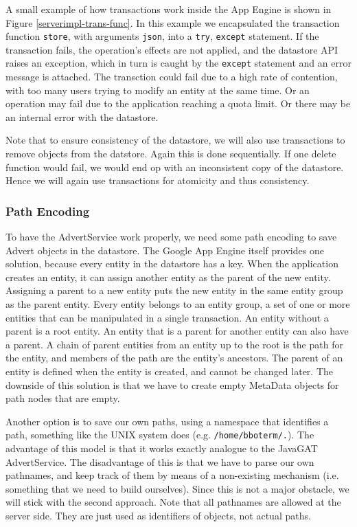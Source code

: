 A small example of how transactions work inside the App Engine is shown in Figure
\ref{serverimpl-trans-func}. In this example we encapsulated the transaction
function \texttt{store}, with arguments \texttt{json}, into a \texttt{try},
\texttt{except} statement. If the transaction fails, the operation's effects are not
applied, and the datastore API raises an exception, which in turn is caught by
the \texttt{except} statement and an error message is attached. The transction
could fail due to a high rate of contention, with too many users trying
to modify an entity at the same time. Or an operation may fail due to the
application reaching a quota limit. Or there may be an internal error with the
datastore.

Note that to ensure consistency of the datastore, we will also use transactions
to remove objects from the datstore. Again this is done sequentially. If one
delete function would fail, we would end op with an inconsistent copy of the
datastore. Hence we will again use transactions for atomicity and thus
consistency.

\subsubsection{Path Encoding}
To have the AdvertService work properly, we need some path encoding to save
Advert objects in the datastore. The Google App Engine itself provides one
solution, because every entity in the datastore has a key. When the application
creates an entity, it can assign another entity as the parent of the new entity.
Assigning a parent to a new entity puts the new entity in the same entity group
as the parent entity. Every entity belongs to an entity group, a set of one or
more entities that can be manipulated in a single transaction. An entity without
a parent is a root entity. An entity that is a parent for another entity can also
have a parent. A chain of parent entities from an entity up to the root is the
path for the entity, and members of the path are the entity's ancestors. The
parent of an entity is defined when the entity is created, and cannot be changed
later. The downside of this solution is that we have to create empty MetaData
objects for path nodes that are empty.

Another option is to save our own paths, using a namespace that identifies a
path, something like the UNIX system does (e.g. \texttt{/home/bboterm/.}). The
advantage of this model is that it works exactly analogue to the JavaGAT
AdvertService. The disadvantage of this is that we have to parse our own
pathnames, and keep track of them by means of a non-existing mechanism (i.e.
something that we need to build ourselves). Since this is not a major obstacle,
we will stick with the second approach. Note that all pathnames are allowed at
the server side. They are just used as identifiers of objects, not actual paths.

